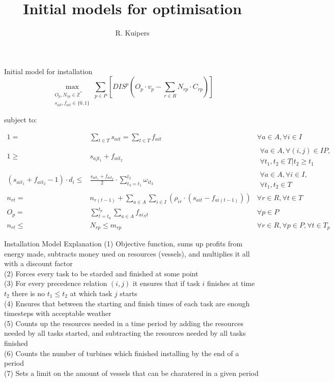 \documentclass{beamer}
\title[Initial models for optimisation]{Initial models for optimisation}
\author{R. Kuipers}
\begin{document}
\begin{frame}
  \titlepage
\end{frame}

\begin{frame}{Initial model for installation}
\scriptsize
\begin{equation}
	\max_{\substack{O_p, N_{rp} \in \mathbb{Z}^* \\
	s_{ait}, f_{ait} \in \{0, 1\}}} 
	\sum_{p \in P} [ DIS^p (O_p \cdot v_p - \sum_{r \in R} N_{rp} \cdot C_{rp}) ]
\end{equation}

\bigskip
subject to:

\begin{align}
1 =& \sum_{t \in T} s_{ait}= \sum_{t \in T} f_{ait}									&	\forall a \in A, \forall i \in I 					\\
1 \geq& s_{ajt_1} + f_{ait_2}											&	\begin{aligned} \forall a \in A, \forall (i, j) \in IP, \\ \forall t_1, t_2 \in T | t_2 \geq t_1\end{aligned}  \\
(s_{ait_1} + f_{ait_2} - 1) \cdot d_i \leq& \frac{s_{ait_1} + f_{ait_2}}{2} \cdot \sum_{t_3 = t_1}^{t_2} \omega_{it_3} & \begin{aligned}\forall a \in A, \forall i \in I, \\ \forall t_1, t_2 \in T \end{aligned} \\
n_{rt} =& n_{r(t-1)} + \sum_{a \in A}\sum_{i\in I} (\rho_{ir} \cdot (s_{ait} - f_{ai(t-1)}))	& 	\forall r \in R, \forall t \in T	\\
O_p =&  \sum_{t = t_0}^{t_p} \sum_{a \in A}  f_{ai_Nt}								& \forall p \in P\\
n_{rt} \leq& N_{rp} \leq m_{rp}													& \forall r \in R, \forall p \in P, \forall t \in T_p
\end{align}

\end{frame}

\begin{frame}{Installation Model Explanation}
(1) Objective function, sums up profits from energy made, subtracts money used on resources (vessels), and multiplies it all with a discount factor	\\
(2) Forces every task to be starded and finished at some point	\\
(3) For every precedence relation $(i, j)$ it ensures that if task $i$ finishes at time $t_2$ there is no $t_1 \leq t_2$ at which task $j$ starts 	\\
(4) Ensures that between the starting and finish times of each task are enough timesteps with acceptable weather	\\
(5) Counts up the resources needed in a time period by adding the resources needed by all tasks started, and subtracting the resources needed by all tasks finished	\\
(6) Counts the number of turbines which finished installing by the end of a period	\\
(7) Sets a limit on the amount of vessels that can be charatered in a given period
\end{frame}
\end{document}
